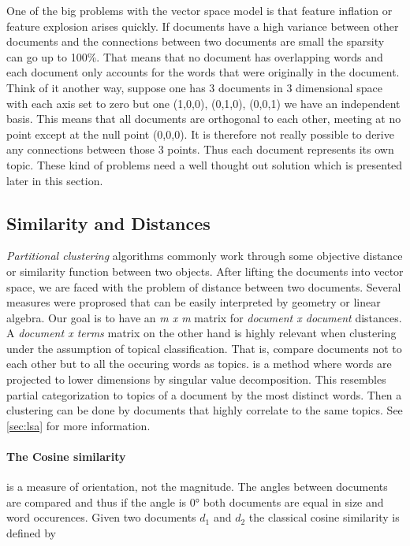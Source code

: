     One of the big problems with the vector space model is that feature inflation or feature explosion arises quickly. If documents have a high variance between other documents and the connections between two documents are small the sparsity can go up to 100\%. That means that no document has overlapping words and each document only accounts for the words that were originally in the document. Think of it another way, suppose one has 3 documents in 3 dimensional space with each axis set to zero but one (1,0,0), (0,1,0), (0,0,1) we have an independent basis. This means that all documents are orthogonal to each other, meeting at no point except at the null point (0,0,0). It is therefore not really possible to derive any connections between those 3 points. Thus each document represents its own topic.
    These kind of problems need a well thought out solution which is presented later in this section.

  \subsection{Similarity and Distances}
  \label{sec:similarity}

    \emph{Partitional clustering} algorithms commonly work through some objective distance or similarity function between two objects. After lifting the documents into vector space, we are faced with the problem of distance between two documents. Several measures were proprosed that can be easily interpreted by geometry or linear algebra. Our goal is to have an \emph{m x m} matrix for \emph{document x document} distances. A \emph{document x terms} matrix on the other hand is highly relevant when clustering under the assumption of topical classification. That is, compare documents not to each other but to all the occuring words as topics. \lsafull{} is a method where words are projected to lower dimensions by singular value decomposition. This resembles partial categorization to topics of a document by the most distinct words. Then a clustering can be done by documents that highly correlate to the same topics. See \ref{sec:lsa} for more information.

    \paragraph{The Cosine similarity} is a measure of orientation, not the magnitude. The angles between documents are compared and thus if the angle is $0°$ both documents are equal in size and word occurences. Given two documents $d_1$ and $d_2$ the classical cosine similarity is defined by

